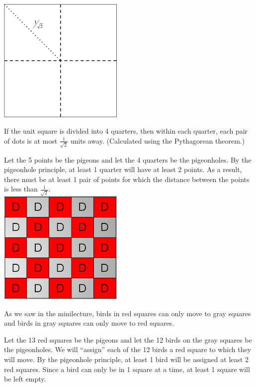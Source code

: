 \documentclass[solution, letterpaper]{cs20inclass}
\begin{document}
\begin{solution}
  \subsolution \includegraphics[width=6cm]{01-1}

If the unit square is divided into 4 quarters, then within each quarter, each pair of dots is at most $\frac{1}{\sqrt{2}}$ units away. (Calculated using the Pythagorean theorem.)

Let the 5 points be the pigeons and let the 4 quarters be the pigeonholes. By the pigeonhole principle, at least 1 quarter will have at least 2 points. As a result, there must be at least 1 pair of points for which the distance between the points is less than $\frac{1}{\sqrt{2}}$.
  \\
  \subsolution \includegraphics[width=6cm]{01-2}

As we saw in the minilecture, birds in red squares can only move to gray squares and birds in gray squares can only move to red squares.

Let the 13 red squares be the pigeons and let the 12 birds on the gray squares be the pigeonholes. We will ``assign'' each of the 12 birds a red square to which they will move. By the pigeonhole principle, at least 1 bird will be assigned at least 2 red squares. Since a bird can only be in 1 square at a time, at least 1 square will be left empty.
\end{solution}
\end{document}
